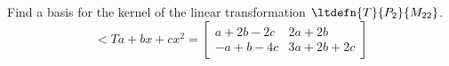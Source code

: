 Find a basis for the kernel of the linear transformation $\ltdefn{T}{P_2}{M_{22}}$.
%
\begin{equation*}
\lt{T}{a+bx+cx^2}=
\begin{bmatrix}
a+2b-2c & 2a+2b \\
-a+b-4c & 3a+2b+2c
\end{bmatrix}
\end{equation*}